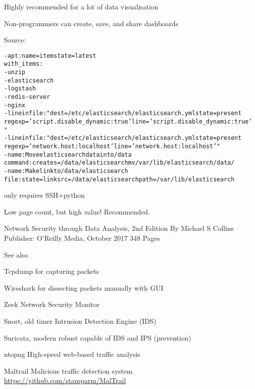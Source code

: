 \documentclass[Screen16to9,17pt]{foils}
\begin{document}


\centerline{Highly recommended for a lot of data visualisation}

Non-programmers can create, save, and share dashboards

Source:



\begin{alltt}\small
- apt: name={{ item }} state=latest
  with_items:
        - unzip
        - elasticsearch
        - logstash
        - redis-server
        - nginx
- lineinfile: "dest=/etc/elasticsearch/elasticsearch.yml state=present
  regexp='script.disable_dynamic: true' line='script.disable_dynamic: true'"
- lineinfile: "dest=/etc/elasticsearch/elasticsearch.yml state=present
  regexp='network.host: localhost' line='network.host: localhost'"
- name: Move elasticsearch data into /data
  command: creates=/data/elasticsearch mv /var/lib/elasticsearch /data/
- name: Make link to /data/elasticsearch
  file: state=link src=/data/elasticsearch path=/var/lib/elasticsearch
\end{alltt}
\vskip 5mm
\centerline{only requires SSH+python }



Low page count, but high value! Recommended.

Network Security through Data Analysis, 2nd Edition
By Michael S Collins
Publisher: O'Reilly Media, October 2017 348 Pages

See also 


\begin{list1}
\item Tcpdump for capturing packets
\item Wireshark for dissecting packets manually with GUI
\item Zeek Network Security Monitor
\item Snort, old timer Intrusion Detection Engine (IDS)
\item Suricata, modern robust capable of IDS and IPS (prevention)
\item ntopng High-speed web-based traffic analysis
\item Maltrail Malicious traffic detection system \url{https://github.com/stamparm/MalTrail}
\end{list1}
\end{document}
